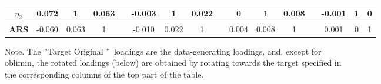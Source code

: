 \documentclass[a4paper,man,natbib]{apa6}
\begin{document}
\begin{linenumbers}
\begin{table}[]
\begin{adjustbox}{width = 0.9\textwidth}
\begin{tabular}{cccccccccccccccc}
		\textbf{$\eta_{2}$} &
		0.072 &
		1 &
		0.063 &
		&
		-0.003 &
		1 &
		0.022 &
		&
		0 &
		1 &
		0.008 &
		&
		-0.001 &
		1 &
		0 \\ \hline
		\textbf{ARS} &
		-0.060 &
		0.063 &
		1 &
		&
		-0.010 &
		0.022 &
		1 &
		&
		0.004 &
		0.008 &
		1 &
		&
		0.001 &
		0 &
		1 \\ \hline
	\end{tabular}
	\end{adjustbox}
\begin{tablenotes}
	\footnotesize
\item Note. The \textquotedblright Target Original \textquotedblright \, loadings are the data-generating loadings, and, except for \\oblimin, the rotated loadings (below) 
are obtained by rotating towards the target specified in \\the corresponding columns of the top part of the table.
\end{tablenotes}
\end{table}




\end{linenumbers}
\end{document}
